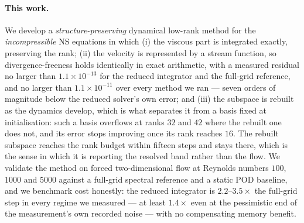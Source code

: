 \paragraph{This work.}
We develop a \emph{structure-preserving} dynamical low-rank method for the
\emph{incompressible} NS equations in which (i) the viscous part is
integrated exactly, preserving the rank; (ii) the velocity is represented by a
stream function, so divergence-freeness holds identically in exact
arithmetic, with a measured residual no larger than $1.1\times10^{-13}$ for
the reduced integrator and the full-grid reference, and no larger than
$1.1\times10^{-11}$ over every method we ran --- seven orders of magnitude
below the reduced solver's own error; and (iii) the subspace is rebuilt as the dynamics develop, which is what
separates it from a basis fixed at initialisation: such a basis overflows at
ranks $32$ and $42$ where the rebuilt one does not, and its error stops
improving once its rank reaches $16$. The rebuilt subspace reaches the rank budget within fifteen steps and stays there, which is the
sense in which it is reporting the resolved band rather than the flow. We validate the method on forced two-dimensional flow at
Reynolds numbers $100$, $1000$ and $5000$ against a full-grid spectral
reference and a static POD baseline, and we benchmark cost honestly: the
reduced integrator is $2.2$--$3.5\times$ the full-grid step in every regime
we measured --- at least $1.4\times$ even at the pessimistic end of the
measurement's own recorded noise --- with no compensating memory benefit.

